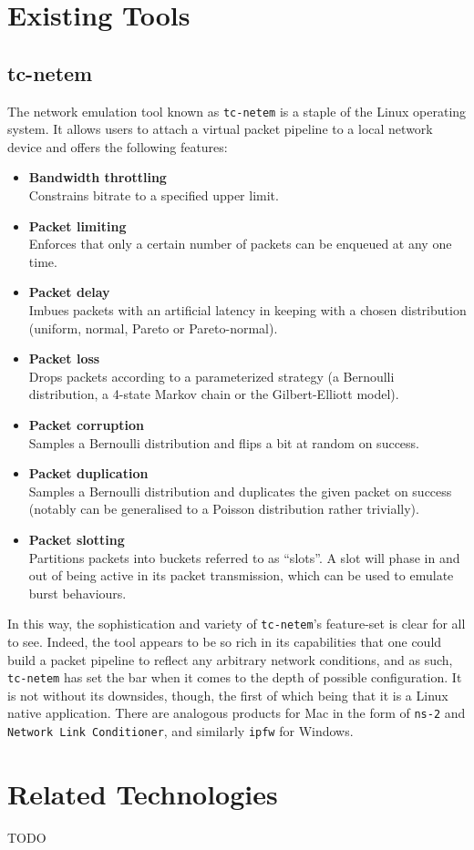 \section{Existing Tools}

\subsection{tc-netem}

The network emulation tool known as \texttt{tc-netem} is a staple of the Linux operating system\cite{tc_netem_wiki,
    tc_netem_8_man,tc_netem_src}. It allows users to attach a virtual packet pipeline to a local network device and
offers the following features:
\begin{itemize}
    \item \textbf{Bandwidth throttling} \\
    Constrains bitrate to a specified upper limit.
    \item \textbf{Packet limiting} \\
    Enforces that only a certain number of packets can be enqueued at any one time.
    \item \textbf{Packet delay} \\
    Imbues packets with an artificial latency in keeping with a chosen distribution (uniform, normal, Pareto or
    Pareto-normal).
    \item \textbf{Packet loss} \\
    Drops packets according to a parameterized strategy (a Bernoulli distribution, a 4-state Markov chain or the
    Gilbert-Elliott model\cite{ge_model}).
    \item \textbf{Packet corruption} \\
    Samples a Bernoulli distribution and flips a bit at random on success.
    \item \textbf{Packet duplication} \\
    Samples a Bernoulli distribution and duplicates the given packet on success (notably can be generalised to a
    Poisson distribution rather trivially).
    \item \textbf{Packet slotting} \\
    Partitions packets into buckets referred to as ``slots''. A slot will phase in and out of being active in its
    packet transmission, which can be used to emulate burst behaviours.
\end{itemize}

In this way, the sophistication and variety of \texttt{tc-netem}'s feature-set is clear for all to see. Indeed, the
tool appears to be so rich in its capabilities that one could build a packet pipeline to reflect any arbitrary
network conditions, and as such, \texttt{tc-netem} has set the bar when it comes to the depth of possible
configuration. It is not without its downsides, though, the first of which being that it is a Linux native
application. There are analogous products for Mac in the form of \texttt{ns-2}\cite{ns_2_man, ns_2_wiki} and
\texttt{Network Link Conditioner}\cite{nlc}, and similarly \texttt{ipfw}\cite{ipfw,ipfw_man} for Windows.


\section{Related Technologies}

TODO
